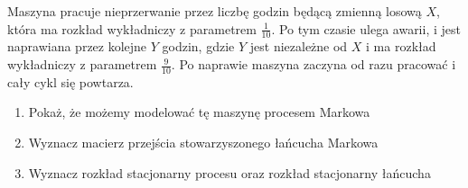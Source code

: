 \begin{exercise}
    Maszyna pracuje nieprzerwanie przez liczbę godzin będącą zmienną losową \( X \), która ma rozkład wykładniczy z parametrem \( \frac{1}{10} \).
    Po tym czasie ulega awarii, i jest naprawiana przez kolejne \( Y \) godzin, gdzie \( Y \) jest niezależne od \( X \) i ma rozkład wykładniczy z parametrem \( \frac{9}{10} \).
    Po naprawie maszyna zaczyna od razu pracować i cały cykl się powtarza.
    
    \begin{enumerate}
        \item Pokaż, że możemy modelować tę maszynę procesem Markowa
        \item Wyznacz macierz przejścia stowarzyszonego łańcucha Markowa
        \item Wyznacz rozkład stacjonarny procesu oraz rozkład stacjonarny łańcucha
    \end{enumerate}
\end{exercise}
